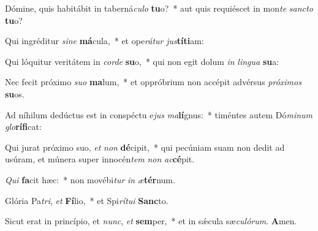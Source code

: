 \item Dómine, quis habitábit in taberná\textit{cu}\textit{lo} \textbf{tu}o?~* aut quis requiéscet in mon\textit{te} \textit{sanc}\textit{to} \textbf{tu}o?
\item Qui ingréditur \textit{si}\textit{ne} \textbf{má}cula,~* et ope\textit{rá}\textit{tur} \textit{jus}\textbf{tí}\textbf{ti}am:
\item Qui lóquitur veritátem in \textit{cor}\textit{de} \textbf{su}o,~* qui non egit dolum \textit{in} \textit{lin}\textit{gua} \textbf{su}a:
\item Nec fecit próximo \textit{su}\textit{o} \textbf{ma}lum,~* et oppróbrium non accépit advérsus \textit{pró}\textit{xi}\textit{mos} \textbf{su}os.
\item Ad níhilum dedúctus est in conspéctu e\textit{jus} \textit{ma}\textbf{lí}gnus:~* timéntes autem Dó\textit{mi}\textit{num} \textit{glo}\textbf{rí}\textbf{fi}cat:
\item Qui jurat próximo suo, \textit{et} \textit{non} \textbf{dé}cipit,~* qui pecúniam suam non dedit ad usúram, et múnera super innocén\textit{tem} \textit{non} \textit{ac}\textbf{cé}pit.
\item \textit{Qui} \textbf{fa}cit hæc:~* non movébi\textit{tur} \textit{in} \textit{æ}\textbf{tér}num.
\item Glória Pa\textit{tri}, \textit{et} \textbf{Fí}lio,~* et Spi\textit{rí}\textit{tu}\textit{i} \textbf{Sanc}to.
\item Sicut erat in princípio, et \textit{nunc}, \textit{et} \textbf{sem}per,~* et in sǽcula sæ\textit{cu}\textit{ló}\textit{rum}. \textbf{A}men.

